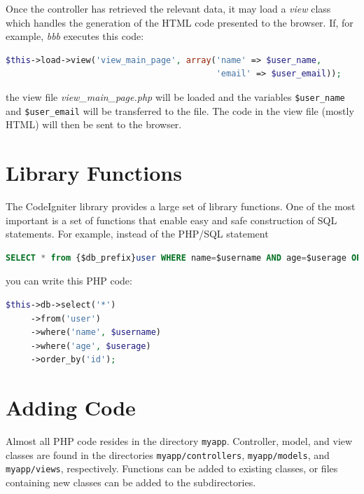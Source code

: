\documentclass[11pt,oneside,a4paper]{memoir}
\begin{document}
Once the controller has retrieved the relevant data, it may load a \emph{view} class which handles
the generation of the HTML code presented to the browser. If, for example, \emph{bbb} executes
this code:

\begin{lstlisting}[language=PHP]
$this->load->view('view_main_page', array('name' => $user_name,
                                          'email' => $user_email));
\end{lstlisting}

\noindent
the view file \emph{view\_main\_page.php} will be loaded and the variables \texttt{\$user\_name} and
\texttt{\$user\_email} will be transferred to the file. The code in the view file (mostly HTML) will
then be sent to the browser.

\section{Library Functions}

The CodeIgniter library provides a large set of library functions. One of the most important is a
set of functions that enable easy and safe construction of SQL statements. For example,
instead of the PHP/SQL statement

\begin{lstlisting}[language=SQL]
SELECT * from {$db_prefix}user WHERE name=$username AND age=$userage ORDER BY id;
\end{lstlisting}

\noindent
you can write this PHP code:

\begin{lstlisting}[language=PHP]
$this->db->select('*')
     ->from('user')
     ->where('name', $username)
     ->where('age', $userage)
     ->order_by('id');
\end{lstlisting}

\section{Adding Code}

Almost all PHP code resides in the directory \texttt{myapp}. Controller,
model, and view classes are found in the directories
\texttt{myapp/controllers}, \texttt{myapp/models}, and \texttt{myapp/views}, respectively. Functions
can be added to existing classes, or files containing new classes can be added to the
subdirectories.
\end{document}
